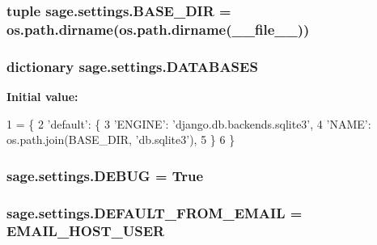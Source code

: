 \subsubsection[{B\+A\+S\+E\+\_\+\+D\+I\+R}]{\setlength{\rightskip}{0pt plus 5cm}tuple sage.\+settings.\+B\+A\+S\+E\+\_\+\+D\+I\+R = os.\+path.\+dirname(os.\+path.\+dirname(\+\_\+\+\_\+file\+\_\+\+\_\+))}\label{namespacesage_1_1settings_add6d83672b1137d74a06bf1606aecf04}
\hypertarget{namespacesage_1_1settings_a870c10acdd1141ac92340ce3e50ffbbd}{}
\subsubsection[{D\+A\+T\+A\+B\+A\+S\+E\+S}]{\setlength{\rightskip}{0pt plus 5cm}dictionary sage.\+settings.\+D\+A\+T\+A\+B\+A\+S\+E\+S}\label{namespacesage_1_1settings_a870c10acdd1141ac92340ce3e50ffbbd}
{\bfseries Initial value\+:}
\begin{DoxyCode}
1 = \{
2     \textcolor{stringliteral}{'default'}: \{
3         \textcolor{stringliteral}{'ENGINE'}: \textcolor{stringliteral}{'django.db.backends.sqlite3'},
4         \textcolor{stringliteral}{'NAME'}: os.path.join(BASE\_DIR, \textcolor{stringliteral}{'db.sqlite3'}),
5     \}
6 \}
\end{DoxyCode}
\hypertarget{namespacesage_1_1settings_acc28086c56df6aed910b2552e07944cc}{}
\subsubsection[{D\+E\+B\+U\+G}]{\setlength{\rightskip}{0pt plus 5cm}sage.\+settings.\+D\+E\+B\+U\+G = True}\label{namespacesage_1_1settings_acc28086c56df6aed910b2552e07944cc}
\hypertarget{namespacesage_1_1settings_a6517c4f93850d63e2bdbe7040ad0e2ff}{}
\subsubsection[{D\+E\+F\+A\+U\+L\+T\+\_\+\+F\+R\+O\+M\+\_\+\+E\+M\+A\+I\+L}]{\setlength{\rightskip}{0pt plus 5cm}sage.\+settings.\+D\+E\+F\+A\+U\+L\+T\+\_\+\+F\+R\+O\+M\+\_\+\+E\+M\+A\+I\+L = {\bf E\+M\+A\+I\+L\+\_\+\+H\+O\+S\+T\+\_\+\+U\+S\+E\+R}}\label{namespacesage_1_1settings_a6517c4f93850d63e2bdbe7040ad0e2ff}
\hypertarget{namespacesage_1_1settings_a2d83ca0a279480aa03599465a0386b17}{}
